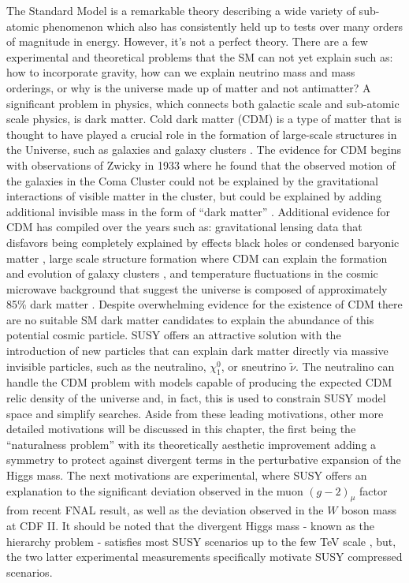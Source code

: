 The Standard Model is a remarkable theory describing a wide variety of sub-atomic phenomenon which also has consistently held up to tests over many orders of magnitude in energy. However, it's not a perfect theory. There are a few  experimental and theoretical problems that the SM can not yet explain such as: how to incorporate gravity,  how can we explain neutrino mass and mass orderings, or why is the universe made up of matter and not antimatter?  
A significant problem in physics, which connects both galactic scale and sub-atomic scale physics, is dark matter. Cold dark matter (CDM) is a type of matter that is thought to have played a crucial role in the formation of large-scale structures in the Universe, such as galaxies and galaxy clusters \cite{Garrett:2010hd}. The evidence for CDM begins with observations of Zwicky in 1933 where he found that the observed motion of the galaxies in the Coma Cluster could not be explained by the gravitational interactions of visible matter in the cluster, but could be explained by adding additional invisible mass in the form of ``dark matter'' \cite{Zwicky:1933gu}. Additional evidence for CDM has compiled over the years such as: gravitational lensing data that disfavors being completely explained by effects black holes or condensed baryonic matter \cite{Massey:2007lens}, large scale structure formation where CDM can explain the formation and evolution of galaxy clusters \cite{Springel:2005}, and temperature fluctuations in the cosmic microwave background that suggest the universe is composed of approximately 85\% dark matter \cite{Planck:2018vyg}. Despite overwhelming evidence for the existence of CDM there are no suitable SM dark matter candidates to explain the abundance of this potential cosmic particle. SUSY offers an attractive solution with the introduction of new particles that can explain dark matter directly via massive invisible particles, such as the neutralino, $\chi_1^0$, or sneutrino $\tilde{\nu}$. The neutralino can handle the CDM problem with models capable of producing the expected CDM relic density of the universe and, in fact, this is used to constrain SUSY model space and simplify searches. Aside from these leading motivations, other more detailed motivations will be discussed in this chapter, the first being the ``naturalness problem'' with its theoretically aesthetic improvement adding a symmetry to protect against divergent terms in the perturbative expansion of the Higgs mass. The next motivations are experimental, where SUSY offers an explanation to the significant deviation observed in the muon $(g-2)_\mu$ factor from recent FNAL result, as well as the deviation observed in the $W$ boson mass at CDF II. It should be noted that the divergent Higgs mass - known as the hierarchy problem - satisfies most SUSY scenarios up to the few TeV scale \cite{Barbieri:1987fn}, but, the two latter experimental measurements specifically motivate SUSY compressed scenarios.



